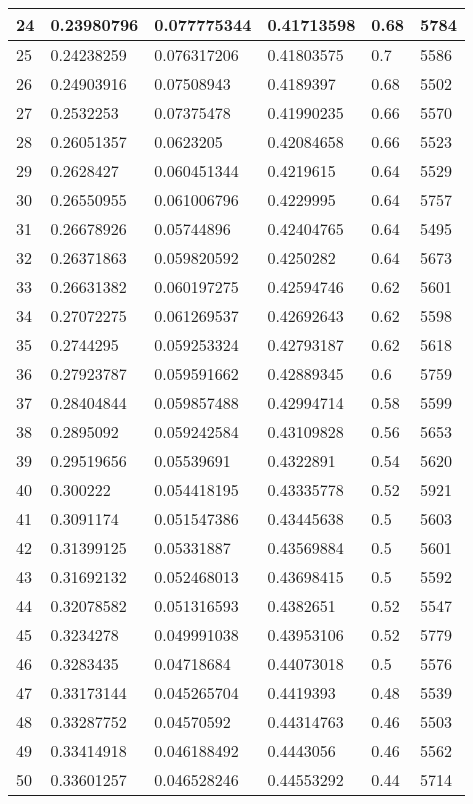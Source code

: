 \begin{longtable}{|l|l|l|l|l|l|}
24 & 0.23980796 & 0.077775344 & 0.41713598 & 0.68 & 5784 \\ \hline 
25 & 0.24238259 & 0.076317206 & 0.41803575 & 0.7 & 5586 \\ \hline 
26 & 0.24903916 & 0.07508943 & 0.4189397 & 0.68 & 5502 \\ \hline 
27 & 0.2532253 & 0.07375478 & 0.41990235 & 0.66 & 5570 \\ \hline 
28 & 0.26051357 & 0.0623205 & 0.42084658 & 0.66 & 5523 \\ \hline 
29 & 0.2628427 & 0.060451344 & 0.4219615 & 0.64 & 5529 \\ \hline 
30 & 0.26550955 & 0.061006796 & 0.4229995 & 0.64 & 5757 \\ \hline 
31 & 0.26678926 & 0.05744896 & 0.42404765 & 0.64 & 5495 \\ \hline 
32 & 0.26371863 & 0.059820592 & 0.4250282 & 0.64 & 5673 \\ \hline 
33 & 0.26631382 & 0.060197275 & 0.42594746 & 0.62 & 5601 \\ \hline 
34 & 0.27072275 & 0.061269537 & 0.42692643 & 0.62 & 5598 \\ \hline 
35 & 0.2744295 & 0.059253324 & 0.42793187 & 0.62 & 5618 \\ \hline 
36 & 0.27923787 & 0.059591662 & 0.42889345 & 0.6 & 5759 \\ \hline 
37 & 0.28404844 & 0.059857488 & 0.42994714 & 0.58 & 5599 \\ \hline 
38 & 0.2895092 & 0.059242584 & 0.43109828 & 0.56 & 5653 \\ \hline 
39 & 0.29519656 & 0.05539691 & 0.4322891 & 0.54 & 5620 \\ \hline 
40 & 0.300222 & 0.054418195 & 0.43335778 & 0.52 & 5921 \\ \hline 
41 & 0.3091174 & 0.051547386 & 0.43445638 & 0.5 & 5603 \\ \hline 
42 & 0.31399125 & 0.05331887 & 0.43569884 & 0.5 & 5601 \\ \hline 
43 & 0.31692132 & 0.052468013 & 0.43698415 & 0.5 & 5592 \\ \hline 
44 & 0.32078582 & 0.051316593 & 0.4382651 & 0.52 & 5547 \\ \hline 
45 & 0.3234278 & 0.049991038 & 0.43953106 & 0.52 & 5779 \\ \hline 
46 & 0.3283435 & 0.04718684 & 0.44073018 & 0.5 & 5576 \\ \hline 
47 & 0.33173144 & 0.045265704 & 0.4419393 & 0.48 & 5539 \\ \hline 
48 & 0.33287752 & 0.04570592 & 0.44314763 & 0.46 & 5503 \\ \hline 
49 & 0.33414918 & 0.046188492 & 0.4443056 & 0.46 & 5562 \\ \hline 
50 & 0.33601257 & 0.046528246 & 0.44553292 & 0.44 & 5714 \\ \hline 
\end{longtable}